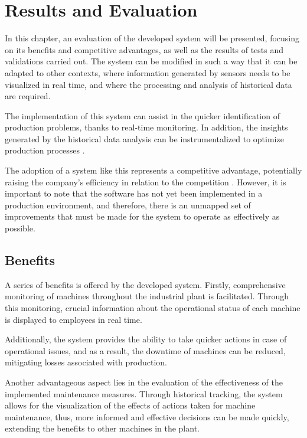 \chapter{Results and Evaluation}\label{cap:results}

In this chapter, an evaluation of the developed system will be presented, focusing on its benefits and competitive advantages, as well as the results of tests and validations carried out. The system can be modified in such a way that it can be adapted to other contexts, where information generated by sensors needs to be visualized in real time, and where the processing and analysis of historical data are required.

The implementation of this system can assist in the quicker identification of production problems, thanks to real-time monitoring. In addition, the insights generated by the historical data analysis can be instrumentalized to optimize production processes \cite{raczSzabo2020realTime}.

The adoption of a system like this represents a competitive advantage, potentially raising the company's efficiency in relation to the competition \cite{ng2011realTime}. However, it is important to note that the software has not yet been implemented in a production environment, and therefore, there is an unmapped set of improvements that must be made for the system to operate as effectively as possible.

\section{Benefits}\label{sec:benfits}

A series of benefits is offered by the developed system. Firstly, comprehensive monitoring of machines throughout the industrial plant is facilitated. Through this monitoring, crucial information about the operational status of each machine is displayed to employees in real time.

Additionally, the system provides the ability to take quicker actions in case of operational issues, and as a result, the downtime of machines can be reduced, mitigating losses associated with production.

Another advantageous aspect lies in the evaluation of the effectiveness of the implemented maintenance measures. Through historical tracking, the system allows for the visualization of the effects of actions taken for machine maintenance, thus, more informed and effective decisions can be made quickly, extending the benefits to other machines in the plant.

